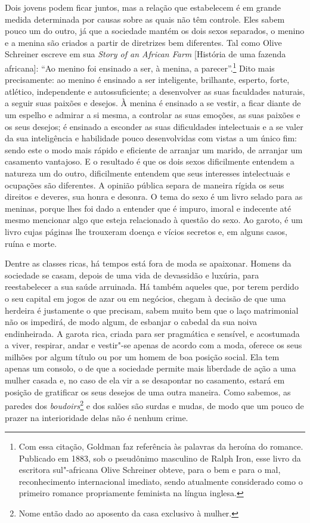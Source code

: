 Dois jovens podem ficar juntos, mas a relação que estabelecem é em
grande medida determinada por causas sobre as quais não têm controle.
Eles sabem pouco um do outro, já que a sociedade mantém os dois sexos
separados, o menino e a menina são criados a partir de diretrizes bem
diferentes. Tal como Olive Schreiner escreve em sua \emph{Story of an African Farm} {[}História de
uma fazenda africana{]}: ``Ao menino
foi ensinado a ser, à menina, a parecer''.\footnote{Com essa citação,
  Goldman faz referência às palavras da heroína do romance. Publicado em
  1883, sob o pseudônimo masculino de Ralph Iron, esse livro da
  escritora sul"-africana Olive Schreiner obteve, para o bem e para o
  mal, reconhecimento internacional imediato, sendo atualmente
  considerado como o primeiro romance propriamente feminista na língua
  inglesa.} Dito mais precisamente: ao menino é ensinado a ser
inteligente, brilhante, esperto, forte, atlético, independente e
autossuficiente; a desenvolver as suas faculdades naturais, a seguir
suas paixões e desejos. À menina é ensinado a se vestir, a ficar
diante de um espelho e admirar a si mesma, a controlar as suas emoções, as
suas paixões e os seus desejos; é ensinado a esconder as suas dificuldades
intelectuais e a se valer da sua inteligência e habilidade pouco desenvolvidas com vistas a um único fim: sendo este o modo mais rápido e eficiente de
arranjar um marido, de arranjar um casamento vantajoso. E o resultado é
que os dois sexos dificilmente entendem a natureza um do outro,
dificilmente entendem que seus interesses intelectuais e ocupações são
diferentes. A opinião pública separa de maneira rígida os seus direitos
e deveres, sua honra e desonra. O tema do sexo é um livro selado para as
meninas, porque lhes foi dado a entender que é impuro, imoral e
indecente até mesmo mencionar algo que esteja relacionado à questão do
sexo. Ao garoto, é um livro cujas páginas lhe trouxeram doença e vícios
secretos e, em alguns casos, ruína e morte.

Dentre as classes ricas, há tempos está fora de moda se apaixonar.
Homens da sociedade se casam, depois de uma vida de devassidão e luxúria,
para reestabelecer a sua saúde arruinada. Há também aqueles que, por terem
perdido o seu capital em jogos de azar ou em negócios, chegam à decisão
de que uma herdeira é justamente o que precisam, sabem muito bem que o
laço matrimonial não os impedirá, de modo algum, de esbanjar o cabedal
da sua noiva endinheirada. A garota rica, criada para ser pragmática e
sensível, e acostumada a viver, respirar, andar e vestir"-se apenas de
acordo com a moda, oferece os seus milhões por algum título ou por um
homem de boa posição social. Ela tem apenas um consolo, o de
que a sociedade permite mais liberdade de ação a uma mulher casada e, no
caso de ela vir a se desapontar no casamento, estará em posição de
gratificar os seus desejos de uma outra maneira. Como sabemos, as
paredes dos \emph{boudoirs}\footnote{Nome então dado ao aposento da casa
  exclusivo à mulher.} e dos salões são surdas e mudas, de modo que um
pouco de prazer na interioridade delas não é nenhum crime.

